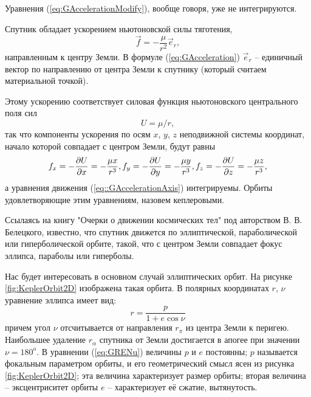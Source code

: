Уравнения (\ref{eq:GAccelerationModify}), вообще говоря, уже не интегрируются.\par
Спутник обладает ускорением ньютоновской силы тяготения,
\begin{equation}  \label{eq:GAcceleration}
  \vec{f} = - \frac{\mu}{r^2}\vec{e}_r,
\end{equation}
направленным к центру Земли. В формуле (\ref{eq:GAcceleration}) $\vec{e}_r$ --
единичный вектор по направлению от центра Земли к спутнику (который считаем
материальной точкой).\par
Этому ускорению соответствует силовая функция ньютоновского центрального поля сил
\begin{equation}
  U = \mu/r,
\end{equation}
так что компоненты ускорения по осям $x$, $y$, $z$ неподвижной системы координат,
начало которой совпадает с центром Земли, будут равны
\begin{equation} \label{eq::GAccelerationAxis}
  f_x = -\frac{\partial U}{\partial x} = - \frac{\mu x}{r^3}, \\
  f_y = -\frac{\partial U}{\partial y} = - \frac{\mu y}{r^3}, \\
  f_z = -\frac{\partial U}{\partial z} = - \frac{\mu z}{r^3},
\end{equation}
а уравнения движения (\ref{eq::GAccelerationAxis}) интегрируемы. Орбиты удовлетворяющие
этим уравнениям, назовем кеплеровыми.\par
Ссылаясь на книгу "Очерки о движении космических тел" под авторством В. В. Белецкого,
известно, что спутник движется по эллиптической, параболической или гиперболической орбите,
такой, что с центром Земли совпадает фокус эллипса, параболы или гиперболы.\par
Нас будет интересовать в основном случай эллиптических орбит. На рисунке \ref{fig:KeplerOrbit2D}
изображена такая орбита. В полярных координатах $r$, $\nu$ уравнение эллипса имеет вид:
\begin{equation} \label{eq:GRENu}
  r = \frac{p}{1 + e\cos\nu}
\end{equation}
причем угол $\nu$ отсчитывается от направления $r_{\pi}$ из центра Земли к перигею.
Наибольшее удаление $r_{\alpha}$ спутника от Земли достигается в апогее при значении
$\nu = 180^{o}$.
В уравнении (\ref{eq:GRENu}) величины $p$ и $e$ постоянны; $p$ называется
фокальным параметром орбиты, и его геометрический смысл ясен из рисунка \ref{fig:KeplerOrbit2D};
эта величина характеризует размер орбиты; вторая величина -- эксцентриситет орбиты $e$ --
характеризует её сжатие, вытянутость.
